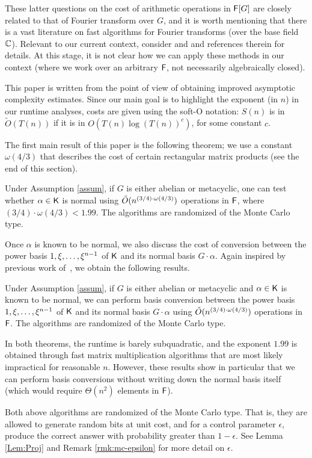 These latter questions on the cost of arithmetic operations in ${\mathsf{F}}[G]$
are closely related to that of Fourier transform over $G$, and it is
worth mentioning that there is a vast literature on fast algorithms
for Fourier transforms (over the base field $\mathbb{C}$). Relevant to our
current context, consider \citep{ClaMu04} and \citep{MaRockWol18} and
references therein for details. At this stage, it is not clear how we
can apply these methods in our context (where we work over an
arbitrary ${\mathsf{F}}$, not necessarily algebraically closed).

This paper is written from the point of view of obtaining improved
asymptotic complexity estimates. Since our main goal is to highlight
the exponent (in $n$) in our runtime analyses, costs are given using
the soft-O notation: $S(n)$ is in $\tilde{O}(T(n))$ if it is in
$O(T(n) \log(T(n))^c)$, for some constant $c$.

The first main result of this paper is the following theorem; we use a
constant $\omega(4/3)$ that describes the cost of certain rectangular
matrix products (see the end of this section).
\begin{theorem}\label{thm:main}
  Under Assumption \ref{assum}, if $G$ is either abelian or
  metacyclic, one can test whether $\alpha \in {\mathsf{K}}$ is normal using
  $\tilde{O}(n^{(3/4)\cdot \omega(4/3)})$ operations in ${\mathsf{F}}$, where
  $(3/4)\cdot\omega(4/3)<1.99$. The algorithms are randomized of the Monte Carlo type.
\end{theorem}
Once $\alpha$ is known to be normal, we also discuss the cost 
of conversion between the power basis $1,\xi,\dots,\xi^{n-1}$
of ${\mathsf{K}}$ and its normal basis $G\cdot \alpha$. Again inspired by
previous work of~\cite{KalSho98}, we obtain the following results.
\begin{theorem}\label{thm:main2}
  Under Assumption \ref{assum}, if $G$ is either abelian or metacyclic
  and $\alpha \in {\mathsf{K}}$ is known to be normal, we can perform basis
  conversion between the power basis $1,\xi,\dots,\xi^{n-1}$ of
  ${\mathsf{K}}$ and its normal basis $G\cdot \alpha$ using $\tilde{O}(n^{(3/4)\cdot \omega(4/3)})$
  operations in ${\mathsf{F}}$. The algorithms are randomized of the Monte Carlo type.
\end{theorem}
In both theorems, the runtime is barely subquadratic, and the exponent
$1.99$ is obtained through fast matrix multiplication algorithms that
are most likely impractical for reasonable $n$. However, these results
show in particular that we can perform basis conversions without
writing down the normal basis itself (which would require
$\Theta(n^2)$ elements in ${\mathsf{F}}$).
\begin{remark}\label{rmk:mc-prob}
Both above algorithms are randomized of the Monte Carlo type.  That is, they are allowed to generate random bits at unit cost, and for a control parameter $\epsilon$, produce the correct answer with probability greater than $1-\epsilon$. See Lemma \ref{Lem:Proj} and Remark 
\ref{rmk:mc-epsilon} for more detail on $\epsilon$.
\end{remark}

